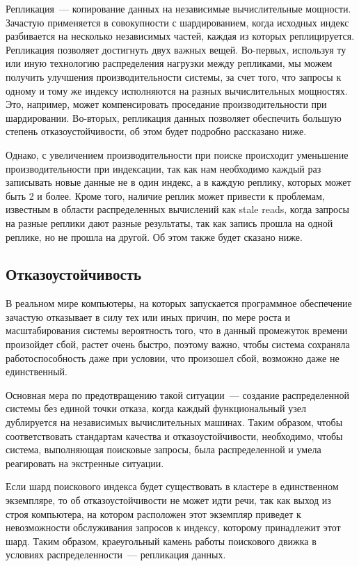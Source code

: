 Репликация~--- копирование данных на независимые вычислительные мощности. Зачастую применяется в совокупности с шардированием, когда исходных индекс разбивается на несколько независимых частей, каждая из которых реплицируется. Репликация позволяет достигнуть двух важных вещей. Во-первых, используя ту или иную технологию распределения нагрузки между репликами, мы можем получить улучшения производительности системы, за счет того, что запросы к одному и тому же индексу исполняются на разных вычислительных мощностях. Это, например, может компенсировать проседание производительности при шардировании. Во-вторых, репликация данных позволяет обеспечить большую степень отказоустойчивости, об этом будет подробно рассказано ниже.

Однако, с увеличением производительности при поиске происходит уменьшение производительности при индексации, так как нам необходимо каждый раз записывать новые данные не в один индекс, а в каждую реплику, которых может быть 2 и более. Кроме того, наличие реплик может привести к проблемам, известным в области распределенных вычислений как stale reads, когда запросы на разные реплики дают разные результаты, так как запись прошла на одной реплике, но не прошла на другой. Об этом также будет сказано ниже.

\subsection{Отказоустойчивость}

В реальном мире компьютеры, на которых запускается программное обеспечение зачастую отказывает в силу тех или иных причин, по мере роста и масштабирования системы вероятность того, что в данный промежуток времени произойдет сбой, растет очень быстро, поэтому важно, чтобы система сохраняла работоспособность даже при условии, что произошел сбой, возможно даже не единственный.

Основная мера по предотвращению такой ситуации~--- создание распределенной системы без единой точки отказа, когда каждый функциональный узел дублируется на независимых вычислительных машинах. Таким образом, чтобы соответствовать стандартам качества и отказоустойчивости, необходимо, чтобы система, выполняющая поисковые запросы, была распределенной и умела реагировать на экстренные ситуации.

Если шард поискового индекса будет существовать в кластере в единственном экземпляре, то об отказоустойчивости не может идти речи, так как выход из строя компьютера, на котором расположен этот экземпляр приведет к невозможности обслуживания запросов к индексу, которому принадлежит этот шард. Таким образом, краеугольный камень работы поискового движка в условиях распределенности~--- репликация данных.

